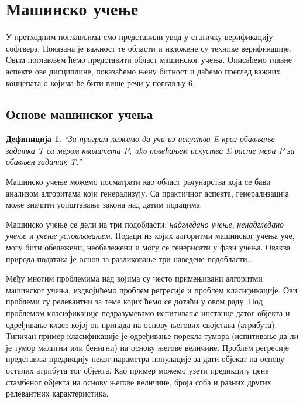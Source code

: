 \documentclass[a4paper]{article}
\newtheorem{definic}{Дефиниција}
\begin{document}
{%
\section{Машинско учење}
У претходним поглављима смо представили увод у статичку верификацију софтвера. Показана је важност те области и изложене су технике верификације. Овим поглављем ћемо представити област машинског учења. Описаћемо главне аспекте ове дисциплине, показаћемо њену битност и даћемо преглед важних концепата о којима ће бити више речи у поглављу 6.

\subsection{Основе машинског учења}
\begin{definic}
``За програм кажемо да учи из искуства E кроз обављање задатка T са мером квалитета P, ako повећањем искуства E расте мера P за обављен задатак T.''
\\[5pt]
\end{definic}


Машинско учење можемо посматрати као област рачунарства која се бави анализом алгоритама који генерализују. Са практичног аспекта, генерализација може значити уопштавање закона над датим подацима.


Машинско учење се дели на три подобласти: \textit{надгледано учење}, \textit{ненадгледано учење} и \textit{учење условљавањем}. Подаци из којих алгоритми машинског учења уче, могу бити обележени, необележени и могу се генерисати у фази учења. Оваква природа података је основ за разликовање три наведене подобласти.\cite{tom-ml}.


Међу многим проблемима над којима су често примењивани алгоритми машинског учења, издвојићемо проблем регресије и проблем класификације. Ови проблеми су релевантни за теме којих ћемо се дотаћи у овом раду. Под проблемом класификације подразумевамо испитивање инстанце датог објекта и одређивање класе којој он припада на основу његових својстава (атрибута). Типичан пример класификације је одређивање порекла тумора (испитивање да ли је тумор малигни или бенигни) на основу његове величине. Проблем регресије представља предикцију неког параметра популације за дати објекат на основу осталих атрибута тог објекта. Као пример можемо узети предикцију цене стамбеног објекта на основу његове величине, броја соба и разних других релевантних карактеристика.


}
\end{document}
